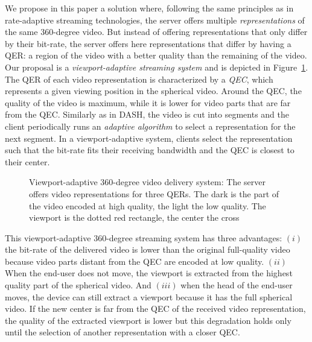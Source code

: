 We propose in this paper a solution where, following the same
principles as in rate-adaptive streaming technologies, the server
offers multiple \emph{representations} of the same $360$-degree video.
But instead of offering representations that only differ by their
bit-rate, the server offers here representations that differ by having
a \ac{QER}: a region of the video with a better quality than the remaining
of the video.
Our proposal is a
\emph{viewport-adaptive streaming system} and is depicted in
Figure~\ref{fig:deliverychain}. The \ac{QER} of each video representation is characterized
by a \emph{\ac{QEC}}, which represents a given viewing position in the
spherical video. Around the \ac{QEC}, the quality of the video is
maximum, while it is lower for video parts that are far from the
\ac{QEC}. Similarly as in \ac{DASH}, the video is cut into segments
and the client periodically runs an \emph{adaptive algorithm} to
select a representation for the next segment. In a
viewport-adaptive system, clients select the representation
such that the bit-rate fits their receiving
bandwidth and the \ac{QEC} is closest to their \FoV{} center.

\begin{figure}
   \centering
   
   \caption{Viewport-adaptive 360-degree video delivery system: The server
   offers video representations for three \acp{QER}. The dark  is the part of the video encoded at high quality, the light
    the low quality. The viewport is the dotted red rectangle, the \FoV{} center the
   cross}
   \label{fig:deliverychain}
\end{figure}

This viewport-adaptive $360$-degree streaming system has three
advantages: $(i)$ the bit-rate of the delivered video is lower than
the original full-quality video because video parts distant from the
\ac{QEC} are encoded at low quality. $(ii)$ When the end-user does not
move, the viewport is extracted from the highest quality part of the
spherical video. And $(iii)$ when the head of the end-user moves, the
device can still extract a viewport because it has the full
spherical video. If the new \FoV{} center is far from the \ac{QEC}
of the received video representation, the quality of the
extracted viewport is lower but this degradation holds only until the
selection of another representation with a closer \ac{QEC}.

